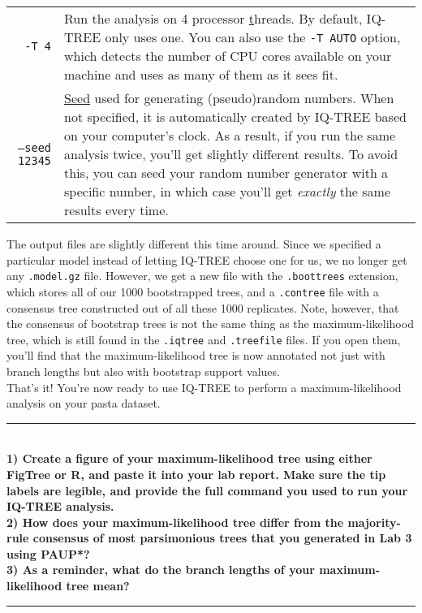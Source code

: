 \documentclass[12pt]{article}
\begin{document}
\begin{longtable}{r p{11cm}}
\texttt{-T 4} & Run the analysis on 4 processor \ul{t}hreads. By default, IQ-TREE only uses one. You can also use the \texttt{-T AUTO} option, which detects the number of CPU cores available on your machine and uses as many of them as it sees fit. \\
\texttt{--seed 12345} & \ul{Seed} used for generating (pseudo)random numbers. When not specified, it is automatically created by IQ-TREE based on your computer's clock. As a result, if you run the same analysis twice, you'll get slightly different results. To avoid this, you can seed your random number generator with a specific number, in which case you'll get \textit{exactly} the same results every time. \\
\bottomrule
\end{longtable}

\noindent The output files are slightly different this time around. Since we specified a particular model instead of letting IQ-TREE choose one for us, we no longer get any \texttt{.model.gz} file. However, we get a new file with the \texttt{.boottrees} extension, which stores all of our 1000 bootstrapped trees, and a \texttt{.contree} file with a consensus tree constructed out of all these 1000 replicates. Note, however, that the consensus of bootstrap trees is not the same thing as the maximum-likelihood tree, which is still found in the \texttt{.iqtree} and \texttt{.treefile} files. If you open them, you'll find that the maximum-likelihood tree is now annotated not just with branch lengths but also with bootstrap support values. \\

\noindent That's it! You're now ready to use IQ-TREE to perform a maximum-likelihood analysis on your pasta dataset. \\

\hrule
\ \\[1ex]
\textbf{1) Create a figure of your maximum-likelihood tree using either FigTree or \textsf{R}, and paste it into your lab report. Make sure the tip labels are legible, and provide the full command you used to run your IQ-TREE analysis.} \\

\noindent\textbf{2) How does your maximum-likelihood tree differ from the majority-rule consensus of most parsimonious trees that you generated in Lab 3 using PAUP*?} \\

\noindent\textbf{3) As a reminder, what do the branch lengths of your maximum-likelihood tree mean?} \\
\hrule
\end{document}
